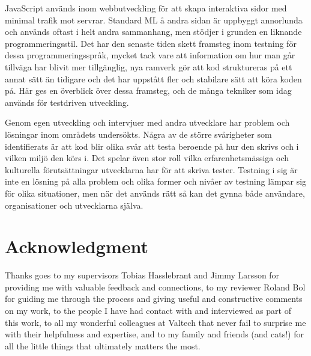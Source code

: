JavaScript används inom webbutveckling för att skapa interaktiva sidor med minimal trafik mot servrar. Standard ML å andra sidan är uppbyggt annorlunda och används oftast i helt andra sammanhang, men stödjer i grunden en liknande programmeringsstil. Det har den senaste tiden skett framsteg inom testning för dessa programmeringsspråk, mycket tack vare att information om hur man går tillväga har blivit mer tillgänglig, nya ramverk gör att kod struktureras på ett annat sätt än tidigare och det har uppstått fler och stabilare sätt att köra koden på. Här ges en överblick över dessa framsteg, och de många tekniker som idag används för testdriven utveckling.

Genom egen utveckling och intervjuer med andra utvecklare har problem och lösningar inom områdets undersökts. Några av de större svårigheter som identifierats är att kod blir olika svår att testa beroende på hur den skrivs och i vilken miljö den körs i. Det spelar även stor roll vilka erfarenhetsmässiga och kulturella förutsättningar utvecklarna har för att skriva tester. Testning i sig är inte en lösning på alla problem och olika former och nivåer av testning lämpar sig för olika situationer, men när det används rätt så kan det gynna både användare, organisationer och utvecklarna själva.

\newpage

\section*{Acknowledgment}

Thanks goes to my supervisors Tobias Hasslebrant and Jimmy Larsson for providing me with valuable feedback and connections, to my reviewer Roland Bol for guiding me through the process and giving useful and constructive comments on my work, to the people I have had contact with and interviewed as part of this work, to all my wonderful colleagues at Valtech that never fail to surprise me with their helpfulness and expertise, and to my family and friends (and cats!) for all the little things that ultimately matters the most.

\newpage
\null
\newpage

\tableofcontents

\newpage
\null
\newpage

